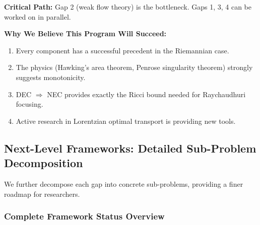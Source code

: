 \textbf{Critical Path:} Gap 2 (weak flow theory) is the bottleneck. Gaps 1, 3, 4 can be worked on in parallel.

\textbf{Why We Believe This Program Will Succeed:}
\begin{enumerate}
    \item Every component has a successful precedent in the Riemannian case.
    \item The physics (Hawking's area theorem, Penrose singularity theorem) strongly suggests monotonicity.
    \item DEC $\Rightarrow$ NEC provides exactly the Ricci bound needed for Raychaudhuri focusing.
    \item Active research in Lorentzian optimal transport is providing new tools.
\end{enumerate}

\subsection{Next-Level Frameworks: Detailed Sub-Problem Decomposition}\label{subsec:SubProblems}

We further decompose each gap into concrete sub-problems, providing a finer roadmap for researchers.

\subsubsection{Complete Framework Status Overview}


